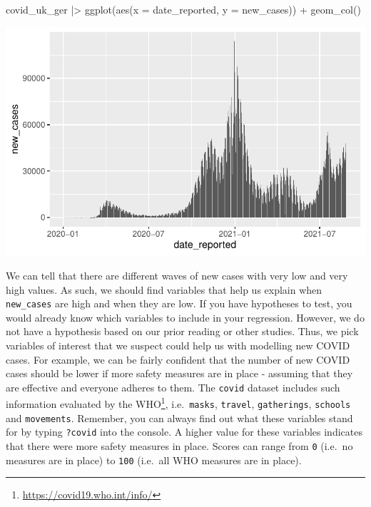 \documentclass[
  letterpaper,
]{krantz}
\makeatletter
\newenvironment{Shaded}{\begin{snugshade}}{\end{snugshade}}
\newcommand{\AttributeTok}[1]{\textcolor[rgb]{0.40,0.45,0.13}{#1}}
\newcommand{\FunctionTok}[1]{\textcolor[rgb]{0.28,0.35,0.67}{#1}}
\newcommand{\NormalTok}[1]{\textcolor[rgb]{0.00,0.23,0.31}{#1}}
\newcommand{\SpecialCharTok}[1]{\textcolor[rgb]{0.37,0.37,0.37}{#1}}
\renewcommand{\href}[2]{#2\footnote{\url{#1}}}
\newenvironment{kframe}{%
\medskip{}
\setlength{\fboxsep}{.8em}
 \def\at@end@of@kframe{}%
 \ifinner\ifhmode%
  \def\at@end@of@kframe{\end{minipage}}%
  \begin{minipage}{\columnwidth}%
 \fi\fi%
 \def\FrameCommand##1{\hskip\@totalleftmargin \hskip-\fboxsep
 \colorbox{shadecolor}{##1}\hskip-\fboxsep
     \hskip-\linewidth \hskip-\@totalleftmargin \hskip\columnwidth}%
 \MakeFramed {\advance\hsize-\width
   \@totalleftmargin\z@ \linewidth\hsize
   \@setminipage}}%
 {\par\unskip\endMakeFramed%
 \at@end@of@kframe}
\renewenvironment{Shaded}{\begin{kframe}}{\end{kframe}}
\makeatother
\begin{document}
\begin{Shaded}
\begin{Highlighting}[]
\NormalTok{covid\_uk\_ger }\SpecialCharTok{|\textgreater{}}
  \FunctionTok{ggplot}\NormalTok{(}\FunctionTok{aes}\NormalTok{(}\AttributeTok{x =}\NormalTok{ date\_reported,}
             \AttributeTok{y =}\NormalTok{ new\_cases)) }\SpecialCharTok{+}
  \FunctionTok{geom\_col}\NormalTok{()}
\end{Highlighting}
\end{Shaded}

\includegraphics{13_regressions_files/figure-pdf/mr-plot-new-cases-1.pdf}

We can tell that there are different waves of new cases with very low
and very high values. As such, we should find variables that help us
explain when \texttt{new\_cases} are high and when they are low. If you
have hypotheses to test, you would already know which variables to
include in your regression. However, we do not have a hypothesis based
on our prior reading or other studies. Thus, we pick variables of
interest that we suspect could help us with modelling new COVID cases.
For example, we can be fairly confident that the number of new COVID
cases should be lower if more safety measures are in place - assuming
that they are effective and everyone adheres to them. The \texttt{covid}
dataset includes such information evaluated by the
\href{https://covid19.who.int/info/}{WHO}, i.e.~\texttt{masks},
\texttt{travel}, \texttt{gatherings}, \texttt{schools} and
\texttt{movements}. Remember, you can always find out what these
variables stand for by typing \texttt{?covid} into the console. A higher
value for these variables indicates that there were more safety measures
in place. Scores can range from \texttt{0} (i.e.~no measures are in
place) to \texttt{100} (i.e.~all WHO measures are in place).
\end{document}

